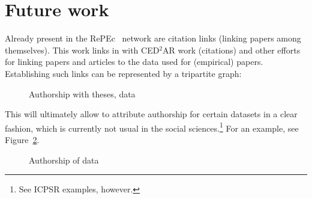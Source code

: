 \documentclass[x11names]{article}
\newcommand{\repec}{RePEc}
\begin{document}
\section{Future work}
\label{sec:future_work}
Already present in the \repec~ network are citation links (linking papers among themselves). This work links in with CED$^2$AR work (citations) and other efforts for linking papers and articles to the data used for (empirical) papers. Establishing such links can be represented by a tripartite graph:

\begin{figure}[ht]
\caption{Authorship with theses, data}\label{fig:tripartite}

\end{figure}
This will ultimately allow to attribute authorship for certain datasets in a clear fashion, which is currently not usual in the social sciences.\footnote{See ICPSR examples, however.} For an example, see Figure~\ref{fig:tripartite-hilite}.

\begin{figure}[ht]
\caption{Authorship of data}\label{fig:tripartite-hilite}

\end{figure}
\end{document}
